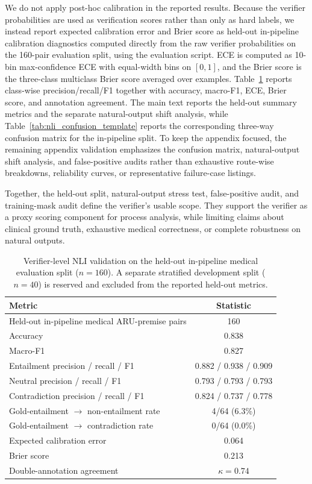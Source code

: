 \documentclass[a4paper,fleqn,doubleblind]{cas-sc}
\begin{document}
We do not apply post-hoc calibration in the reported results. Because the verifier probabilities are used as verification scores rather than only as hard labels, we instead report expected calibration error and Brier score as held-out in-pipeline calibration diagnostics computed directly from the raw verifier probabilities on the 160-pair evaluation split, using the evaluation script. ECE is computed as 10-bin max-confidence ECE with equal-width bins on $[0,1]$, and the Brier score is the three-class multiclass Brier score averaged over examples. Table~\ref{tab:nli_validation_template} reports class-wise precision/recall/F1 together with accuracy, macro-F1, ECE, Brier score, and annotation agreement. The main text reports the held-out summary metrics and the separate natural-output shift analysis, while Table~\ref{tab:nli_confusion_template} reports the corresponding three-way confusion matrix for the in-pipeline split. To keep the appendix focused, the remaining appendix validation emphasizes the confusion matrix, natural-output shift analysis, and false-positive audits rather than exhaustive route-wise breakdowns, reliability curves, or representative failure-case listings.

Together, the held-out split, natural-output stress test, false-positive audit, and training-mask audit define the verifier's usable scope. They support the verifier as a proxy scoring component for process analysis, while limiting claims about clinical ground truth, exhaustive medical correctness, or complete robustness on natural outputs.

\begin{table}[htbp]
    \centering
    \caption{Verifier-level NLI validation on the held-out in-pipeline medical evaluation split ($n=160$). A separate stratified development split ($n=40$) is reserved and excluded from the reported held-out metrics.}
    \label{tab:nli_validation_template}
    \begin{tabular}{lc}
        \toprule
        \textbf{Metric} & \textbf{Statistic} \\
        \midrule
        Held-out in-pipeline medical ARU-premise pairs & 160 \\
        Accuracy & 0.838 \\
        Macro-F1 & 0.827 \\
        Entailment precision / recall / F1 & 0.882 / 0.938 / 0.909 \\
        Neutral precision / recall / F1 & 0.793 / 0.793 / 0.793 \\
        Contradiction precision / recall / F1 & 0.824 / 0.737 / 0.778 \\
        Gold-entailment $\rightarrow$ non-entailment rate & 4/64 (6.3\%) \\
        Gold-entailment $\rightarrow$ contradiction rate & 0/64 (0.0\%) \\
        Expected calibration error & 0.064 \\
        Brier score & 0.213 \\
        Double-annotation agreement & $\kappa=0.74$ \\
        \bottomrule
    \end{tabular}
\end{table}
\end{document}
